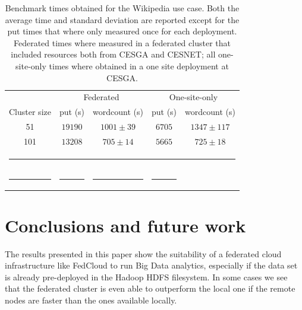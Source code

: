 \documentclass[oribibl]{llncs_Ibergrid2013}
\begin{document}
\begin{table}[h!]
\caption{Benchmark times obtained for the Wikipedia use case. Both the average time and standard deviation are reported except for the put times that where only measured once for each deployment. Federated times where measured in a federated cluster that included resources both from CESGA and CESNET; all one-site-only times where obtained in a one site deployment at CESGA. }
\label{table:wikipedia}
%
\vspace{-0.5em}
%
\begin{center}
\begin{tabular}{ccccc}
\toprule
    					& \multicolumn{2}{c}{Federated} 		& \multicolumn{2}{c}{One-site-only} \\
Cluster size				& put (s)		& wordcount (s) 	& put (s)		& wordcount (s)\\
\midrule
51                   			& $19190$		& $1001\pm39$      	& $6705$		& $1347\pm117$\\
101                  			& $13208$		& $705\pm14$      	& $5665$		& $725\pm18$\\
%
\bottomrule
\multicolumn{5}{c}{\rule{0.98\textwidth}{0em}}\\
\rule{0.2\textwidth}{0cm} & \rule{0.2\textwidth}{0cm} & \rule{0.2\textwidth}{0cm} &  \rule{0.2\textwidth}{0cm} & \\
\end{tabular}
\end{center}
\end{table}



\section{Conclusions and future work}
\label{sect-conclusions}
The results presented in this paper show the suitability of a federated cloud infrastructure like FedCloud to run Big Data analytics, especially if the data set is already pre-deployed in the Hadoop HDFS filesystem. In some cases we see that the federated cluster is even able to outperform the local one if the remote nodes are faster than the ones available locally.
\end{document}
